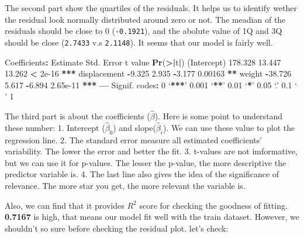 \documentclass[]{article}
\newenvironment{Shaded}{\begin{snugshade}}{\end{snugshade}}
\newcommand{\KeywordTok}[1]{\textcolor[rgb]{0.13,0.29,0.53}{\textbf{#1}}}
\newcommand{\DecValTok}[1]{\textcolor[rgb]{0.00,0.00,0.81}{#1}}
\newcommand{\FloatTok}[1]{\textcolor[rgb]{0.00,0.00,0.81}{#1}}
\newcommand{\StringTok}[1]{\textcolor[rgb]{0.31,0.60,0.02}{#1}}
\newcommand{\OperatorTok}[1]{\textcolor[rgb]{0.81,0.36,0.00}{\textbf{#1}}}
\newcommand{\ErrorTok}[1]{\textcolor[rgb]{0.64,0.00,0.00}{\textbf{#1}}}
\newcommand{\NormalTok}[1]{#1}
\begin{document}
The second part show the quartiles of the residuals. It helps us to
identify wether the residual look normally distributed around zero or
not. The meadian of the residuals should be close to 0
(\texttt{-0.1921}), and the abolute value of 1Q and 3Q should be close
(\texttt{2.7433} v.s \texttt{2.1148}). It seems that our model is fairly
well.

\begin{Shaded}
\begin{Highlighting}[]
\NormalTok{Coefficients}\OperatorTok{:}
\StringTok{             }\NormalTok{Estimate Std. Error t value }\KeywordTok{Pr}\NormalTok{(}\OperatorTok{>}\ErrorTok{|}\NormalTok{t}\OperatorTok{|}\NormalTok{)    }
\NormalTok{(Intercept)   }\FloatTok{178.328}     \FloatTok{13.447}  \FloatTok{13.262}  \OperatorTok{<}\StringTok{ }\FloatTok{2e-16} \OperatorTok{**}\ErrorTok{*}
\NormalTok{displacement   }\OperatorTok{-}\FloatTok{9.325}      \FloatTok{2.935}  \OperatorTok{-}\FloatTok{3.177}  \FloatTok{0.00163} \OperatorTok{**}\StringTok{ }
\NormalTok{weight        }\OperatorTok{-}\FloatTok{38.726}      \FloatTok{5.617}  \OperatorTok{-}\FloatTok{6.894} \FloatTok{2.65e-11} \OperatorTok{**}\ErrorTok{*}
\OperatorTok{---}
\NormalTok{Signif. codes}\OperatorTok{:}\StringTok{  }\DecValTok{0}\NormalTok{ ‘}\OperatorTok{**}\ErrorTok{*}\NormalTok{’ }\FloatTok{0.001}\NormalTok{ ‘}\OperatorTok{**}\NormalTok{’ }\FloatTok{0.01}\NormalTok{ ‘}\OperatorTok{*}\NormalTok{’ }\FloatTok{0.05}\NormalTok{ ‘.’ }\FloatTok{0.1}\NormalTok{ ‘ ’ }\DecValTok{1}
\end{Highlighting}
\end{Shaded}

The third part is about the coefficients (\(\hat\beta\)). Here is some
point to understand these number: 1. Intercept (\(\hat\beta_{0}\)) and
slope(\(\hat\beta_{i}\)). We can use these value to plot the regression
line. 2. The standard error measure all estimated coefficients'
variability. The lower the error and better the fit. 3. t-values are not
imformative, but we can use it for p-values. The lesser the p-value, the
more descriptive the predictor variable is. 4. The last line also gives
the idea of the significance of relevance. The more star you get, the
more relevant the variable is.

Also, we can find that it provides \(R^2\) score for checking the
goodness of fitting. \textbf{0.7167} is high, that means our model fit
well with the train dataset. However, we shouldn't so sure before
checking the residual plot. let's check:
\end{document}
